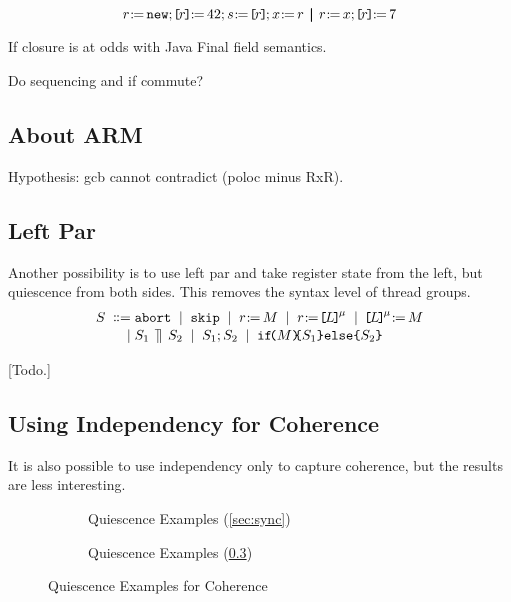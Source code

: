 \begin{displaymath}
r \GETS \mathtt{new}\SEMI
\REF{r} \GETS 42\SEMI
s \GETS \REF{r}\SEMI
x \GETS r
\PAR
r \GETS x\SEMI
\REF{r} \GETS 7
\end{displaymath}

If closure is at odds with Java Final field semantics.

Do sequencing and if commute?

\subsection{About ARM}
Hypothesis: gcb cannot contradict (poloc minus RxR).


\subsection{Left Par}

Another possibility is to use left par and take register state from the left,
but quiescence from both sides.  This removes the syntax level of thread
groups.
\begin{align*}
  \aCmd
  \BNFDEF& \ABORT
  \BNFSEP \SKIP
  \BNFSEP \LET{\aReg}{\aExp}
  \BNFSEP \PRREF[\amode]{\cExp}{\aReg}
  \BNFSEP \PWREF[\amode]{\cExp}{\aExp}
  \\[-.5ex]
  \BNFSEP& \aCmd_1 \LPAR \aCmd_2
  \BNFSEP \aCmd_1 \SEMI \aCmd_2
  \BNFSEP \IF{\aExp} \THEN \aCmd_1 \ELSE \aCmd_2 \FI  
\end{align*}

[Todo.]

\subsection{Using Independency for Coherence}
\label{sec:independency-co}

It is also possible to use independency only to capture coherence, but the
results are less interesting.

\begin{figure*}[t]
  \begin{subfigure}{.5\textwidth}
    \centering
    
    \caption{Quiescence Examples (\textsection\ref{sec:sync})}
    \label{fig:q1}
  \end{subfigure}  
  \begin{subfigure}{.5\textwidth}
    \centering
    
    \caption{Quiescence Examples (\textsection\ref{sec:independency-co})}
    \label{fig:q2}
  \end{subfigure}
  \caption{Quiescence Examples for Coherence}
  \label{fig:q-co}
\end{figure*}
%   
%   

